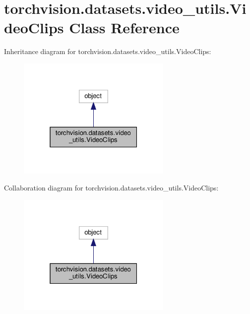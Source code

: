 \hypertarget{classtorchvision_1_1datasets_1_1video__utils_1_1VideoClips}{}\section{torchvision.\+datasets.\+video\+\_\+utils.\+Video\+Clips Class Reference}
\label{classtorchvision_1_1datasets_1_1video__utils_1_1VideoClips}


Inheritance diagram for torchvision.\+datasets.\+video\+\_\+utils.\+Video\+Clips\+:
\nopagebreak
\begin{figure}[H]
\begin{center}
\leavevmode
\includegraphics[width=211pt]{classtorchvision_1_1datasets_1_1video__utils_1_1VideoClips__inherit__graph}
\end{center}
\end{figure}


Collaboration diagram for torchvision.\+datasets.\+video\+\_\+utils.\+Video\+Clips\+:
\nopagebreak
\begin{figure}[H]
\begin{center}
\leavevmode
\includegraphics[width=211pt]{classtorchvision_1_1datasets_1_1video__utils_1_1VideoClips__coll__graph}
\end{center}
\end{figure}
